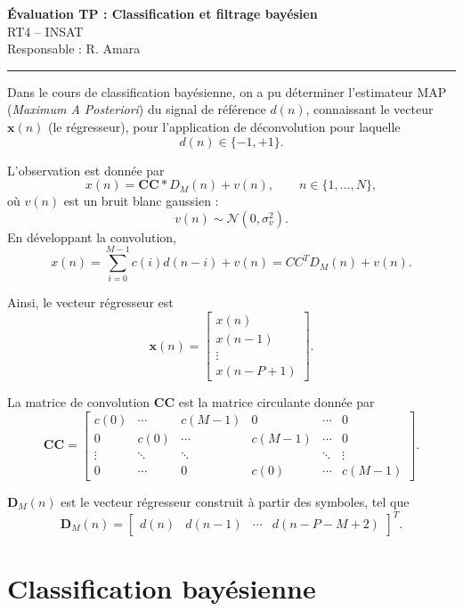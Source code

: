 \documentclass[11pt,a4paper]{article}
\newcommand{\CC}{\mathbf{CC}}
\newcommand{\D}{\mathbf{D}}
\newcommand{\xv}{\mathbf{x}}
\begin{document}
\begin{center}
    {\Large\bfseries Évaluation TP : Classification et filtrage bayésien}\\[0.35em]
    {\large RT4 -- INSAT}\\
    Responsable : R. Amara
\end{center}

\vspace{0.5em}
\hrule
\vspace{0.8em}

Dans le cours de classification bayésienne, on a pu déterminer l'estimateur
MAP (\textit{Maximum A Posteriori}) du signal de référence $d(n)$,
connaissant le vecteur $\xv(n)$ (le régresseur), pour l'application de
déconvolution pour laquelle
\[
    d(n)\in\{-1,+1\}.
\]

L'observation est donnée par
\[
    x(n)=\CC * D_M(n)+v(n), \qquad n\in\{1,\ldots,N\},
\]
où $v(n)$ est un bruit blanc gaussien :
\[
    v(n)\sim\mathcal{N}(0,\sigma_v^2).
\]
En développant la convolution,
\[
    x(n)
    =\sum_{i=0}^{M-1}c(i)d(n-i)+v(n)
    =CC^{T} D_M(n)+v(n).
\]

Ainsi, le vecteur régresseur est
\[
    \xv(n)=
    \begin{bmatrix}
        x(n)\\
        x(n-1)\\
        \vdots\\
        x(n-P+1)
    \end{bmatrix}.
\]

La matrice de convolution $\CC$ est la matrice circulante donnée par
\[
\CC=
\begin{bmatrix}
c(0) & \cdots & c(M-1) & 0 & \cdots & 0\\
0 & c(0) & \cdots & c(M-1) & \cdots & 0\\
\vdots & \ddots & \ddots & & \ddots & \vdots\\
0 & \cdots & 0 & c(0) & \cdots & c(M-1)
\end{bmatrix}.
\]

$\D_M(n)$ est le vecteur régresseur construit à partir des symboles, tel que
\[
    \D_M(n)=
    \begin{bmatrix}
        d(n) & d(n-1) & \cdots & d(n-P-M+2)
    \end{bmatrix}^{T}.
\]

\section{Classification bayésienne}
\end{document}
